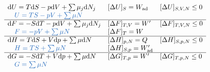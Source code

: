\begin{veta}[Shrnutí pro $U = U(S,V,N_1,\dots,N_l)$ \quad ($\dd W' = \dd W + p\dd V$)]
\renewcommand{\arraystretch}{1.6}
\[
  \begin{array}{lll}
    \dd U = T\dd S - p\dd V + \sum\mu_j\dd N_j & [\Delta U]_S = W_{\text{ad}} & [\Delta U]_{S,V,N}\leq 0 \\
    \quad\textcolor{NavyBlue}{U = TS - pV + \sum\mu N} & & \\ \hline
    \dd F = -S\dd T - p\dd V + \sum\mu_j\dd N_j & [\Delta F]_{T,V} = W' & [\Delta F]_{T,V,N}\leq 0 \\
    \quad\textcolor{NavyBlue}{F = -pV + \sum\mu N} & [\Delta F]_T = W & \\ \hline
    \dd H = T\dd S + V\dd p + \sum\mu\dd N & [\Delta H]_{p,N} = Q & [\Delta H]_{S,p,N}\leq 0 \\
    \quad\textcolor{NavyBlue}{H = TS + \sum\mu N} & [\Delta H]_{S,p} = W'_{\text{ad}} & \\ \hline
    \dd G = -S\dd T + V\dd p + \sum\mu\dd N & [\Delta G]_{T,p} = W' & [\Delta G]_{T,p,N}\leq 0 \\
    \quad\textcolor{NavyBlue}{G = \sum\mu N} & &
  \end{array}
\]
\end{veta}


